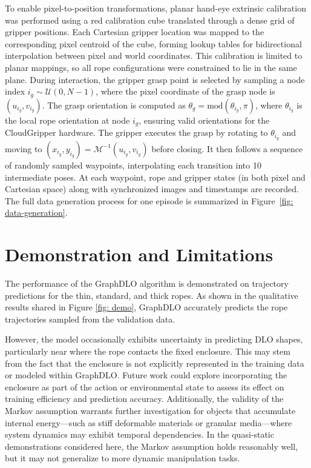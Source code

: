 \documentclass[letterpaper, 10 pt, conference]{IEEETran}
\begin{document}
To enable pixel-to-position transformations, planar hand-eye extrinsic calibration was performed using a red calibration cube translated through a dense grid of gripper positions. Each Cartesian gripper location was mapped to the corresponding pixel centroid of the cube, forming lookup tables for bidirectional interpolation between pixel and world coordinates. This calibration is limited to planar mappings, so all rope configurations were constrained to lie in the same plane. During interaction, the gripper grasp point is selected by sampling a node index $i_g \sim \mathcal{U}(0, N-1)$, where the pixel coordinate of the grasp node is $\left(u_{i_g}, v_{i_g}\right)$. The grasp orientation is computed as $\theta_g = \text{mod}(\theta_{i_g}, \pi)$, where $\theta_{i_g}$ is the local rope orientation at node $i_g$, ensuring valid orientations for the CloudGripper hardware. The gripper executes the grasp by rotating to $\theta_{i_g}$ and moving to $\left(x_{i_g}, y_{i_g}\right) = \mathcal{M}^{-1}\left(u_{i_g}, v_{i_g}\right)$ before closing. It then follows a sequence of randomly sampled waypoints, interpolating each transition into 10 intermediate poses. At each waypoint, rope and gripper states (in both pixel and Cartesian space) along with synchronized images and timestamps are recorded. The full data generation process for one episode is summarized in Figure~\ref{fig: data-generation}.

\section{Demonstration and Limitations}
\label{sec:demonstration}

The performance of the GraphDLO algorithm is demonstrated on trajectory predictions for the thin, standard, and thick ropes. As shown in the qualitative results shared in Figure \ref{fig: demo}, GraphDLO accurately predicts the rope trajectories sampled from the validation data. 

However, the model occasionally exhibits uncertainty in predicting DLO shapes, particularly near where the rope contacts the fixed enclosure. This may stem from the fact that the enclosure is not explicitly represented in the training data or modeled within GraphDLO. Future work could explore incorporating the enclosure as part of the action or environmental state to assess its effect on training efficiency and prediction accuracy. Additionally, the validity of the Markov assumption warrants further investigation for objects that accumulate internal energy—such as stiff deformable materials or granular media—where system dynamics may exhibit temporal dependencies. In the quasi-static demonstrations considered here, the Markov assumption holds reasonably well, but it may not generalize to more dynamic manipulation tasks.
\end{document}

